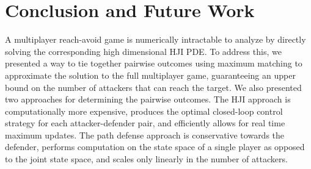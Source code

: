 \section{Conclusion and Future Work}
\label{sec:conclusion}
A multiplayer reach-avoid game is numerically intractable to analyze by directly solving the corresponding high dimensional HJI PDE. To address this, we presented a way to tie together pairwise outcomes using maximum matching to approximate the solution to the full multiplayer game, guaranteeing an upper bound on the number of attackers that can reach the target. We also presented two approaches for determining the pairwise outcomes. The HJI approach is computationally more expensive, produces the optimal closed-loop control strategy for each attacker-defender pair, and efficiently allows for real time maximum updates. The path defense approach is conservative towards the defender, performs computation on the state space of a single player as opposed to the joint state space, and scales only linearly in the number of attackers.

